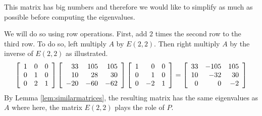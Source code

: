 \begin{solution} This matrix has big numbers and therefore we would like
to simplify as much as possible before computing the eigenvalues.

We will do so using row operations. First, add $2$ times the second row
to the third row. To do so, left multiply $A$ by $E \left(2,2\right)$. 
Then right multiply $A$ by the inverse of $E \left(2,2\right)$ as illustrated.
\begin{equation*}
\left[
\begin{array}{rrr}
1 & 0 & 0 \\
0 & 1 & 0 \\
0 & 2 & 1
\end{array}
\right] \left[
\begin{array}{rrr}
33 & 105 & 105 \\
10 & 28 & 30 \\
-20 & -60 & -62
\end{array}
\right] \left[
\begin{array}{rrr}
1 & 0 & 0 \\
0 & 1 & 0 \\
0 & -2 & 1
\end{array}
\right] =\left[
\begin{array}{rrr}
33 & -105 & 105 \\
10 & -32 & 30 \\
0 & 0 & -2
\end{array}
\right]
\end{equation*}
By Lemma \ref{lem:similarmatrices}, the resulting matrix has the same eigenvalues as $A$ where here, the matrix $E \left(2,2\right)$ plays the role of $P$.


\end{solution}
